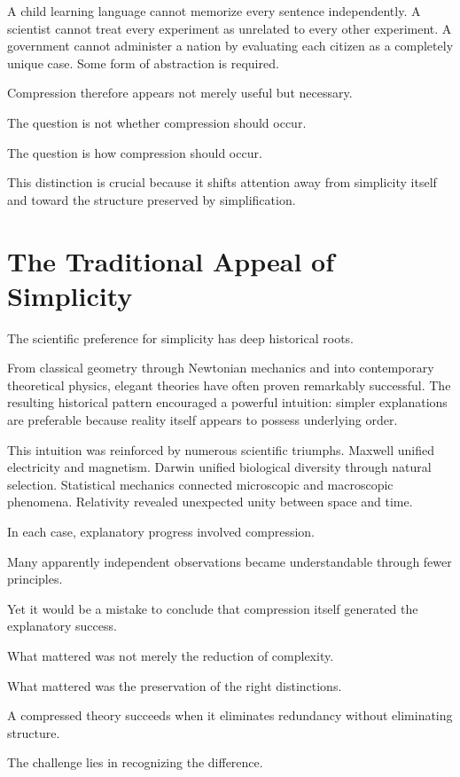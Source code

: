 \documentclass[11pt,oneside,openany]{book}
\begin{document}
A child learning language cannot memorize every sentence independently. A scientist cannot treat every experiment as unrelated to every other experiment. A government cannot administer a nation by evaluating each citizen as a completely unique case. Some form of abstraction is required.

Compression therefore appears not merely useful but necessary.

The question is not whether compression should occur.

The question is how compression should occur.

This distinction is crucial because it shifts attention away from simplicity itself and toward the structure preserved by simplification.

\section{The Traditional Appeal of Simplicity}

The scientific preference for simplicity has deep historical roots.

From classical geometry through Newtonian mechanics and into contemporary theoretical physics, elegant theories have often proven remarkably successful. The resulting historical pattern encouraged a powerful intuition: simpler explanations are preferable because reality itself appears to possess underlying order.

This intuition was reinforced by numerous scientific triumphs. Maxwell unified electricity and magnetism. Darwin unified biological diversity through natural selection. Statistical mechanics connected microscopic and macroscopic phenomena. Relativity revealed unexpected unity between space and time.

In each case, explanatory progress involved compression.

Many apparently independent observations became understandable through fewer principles.

Yet it would be a mistake to conclude that compression itself generated the explanatory success.

What mattered was not merely the reduction of complexity.

What mattered was the preservation of the right distinctions.

A compressed theory succeeds when it eliminates redundancy without eliminating structure.

The challenge lies in recognizing the difference.
\end{document}
